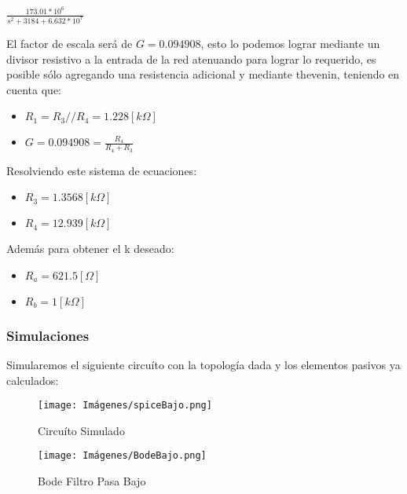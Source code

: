     \begin{center}
        $\frac{173.01*10^6}{s^2 + 3184 + 6.632*10^7}$
    \end{center}

    El factor de escala será de $G = 0.094908$, esto lo podemos lograr mediante un divisor resistivo a la entrada de la red atenuando para lograr lo requerido, es posible sólo agregando una resistencia adicional y mediante thevenin, teniendo en cuenta que:\\

    \begin{itemize}
        \item $R_1 = R_3//R_4 = 1.228 [k\Omega]$
        \item $G = 0.094908 = \frac{R_4}{R_4+R_3}$
    \end{itemize}

    Resolviendo este sistema de ecuaciones:\\

    \begin{itemize}
        \item $R_3 = 1.3568 [k\Omega]$
        \item $R_4 = 12.939 [k\Omega]$
    \end{itemize}

    Además para obtener el k deseado:\\

    \begin{itemize}
        \item $R_a = 621.5 [\Omega]$
        \item $R_b = 1 [k\Omega]$
    \end{itemize}
    
    \newpage
    \subsubsection{Simulaciones}
    Simularemos el siguiente circuíto con la topología dada y los elementos pasivos ya calculados:\\

    \begin{figure}[ht]
        \centering
        \texttt{[image: Imágenes/spiceBajo.png]}
        \caption{Circuíto Simulado}
    \end{figure}
    
    \begin{figure}[ht]
        \centering
        \texttt{[image: Imágenes/BodeBajo.png]}
        \caption{Bode Filtro Pasa Bajo}
    \end{figure}
    
